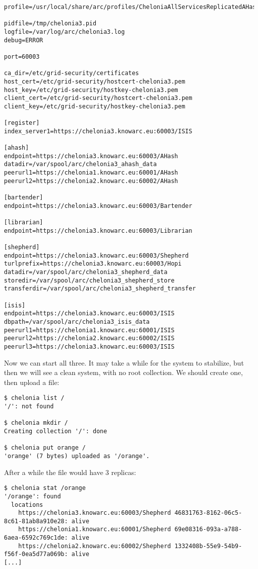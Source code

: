 \documentclass{article}
\begin{document}
\begin{verbatim}
profile=/usr/local/share/arc/profiles/CheloniaAllServicesReplicatedAHashWithISIS.xml

pidfile=/tmp/chelonia3.pid
logfile=/var/log/arc/chelonia3.log
debug=ERROR

port=60003

ca_dir=/etc/grid-security/certificates
host_cert=/etc/grid-security/hostcert-chelonia3.pem
host_key=/etc/grid-security/hostkey-chelonia3.pem
client_cert=/etc/grid-security/hostcert-chelonia3.pem
client_key=/etc/grid-security/hostkey-chelonia3.pem

[register]
index_server1=https://chelonia3.knowarc.eu:60003/ISIS

[ahash]
endpoint=https://chelonia3.knowarc.eu:60003/AHash
datadir=/var/spool/arc/chelonia3_ahash_data
peerurl1=https://chelonia1.knowarc.eu:60001/AHash
peerurl2=https://chelonia2.knowarc.eu:60002/AHash

[bartender]
endpoint=https://chelonia3.knowarc.eu:60003/Bartender

[librarian]
endpoint=https://chelonia3.knowarc.eu:60003/Librarian

[shepherd]
endpoint=https://chelonia3.knowarc.eu:60003/Shepherd
turlprefix=https://chelonia3.knowarc.eu:60003/Hopi
datadir=/var/spool/arc/chelonia3_shepherd_data
storedir=/var/spool/arc/chelonia3_shepherd_store
transferdir=/var/spool/arc/chelonia3_shepherd_transfer

[isis]
endpoint=https://chelonia3.knowarc.eu:60003/ISIS
dbpath=/var/spool/arc/chelonia3_isis_data
peerurl1=https://chelonia1.knowarc.eu:60001/ISIS
peerurl2=https://chelonia2.knowarc.eu:60002/ISIS
peerurl3=https://chelonia3.knowarc.eu:60003/ISIS
\end{verbatim}

Now we can start all three. It may take a while for the system to stabilize, but then we will see a clean system, with no root collection. We should create one, then upload a file:

\begin{verbatim}
$ chelonia list /
'/': not found

$ chelonia mkdir /
Creating collection '/': done

$ chelonia put orange /
'orange' (7 bytes) uploaded as '/orange'.
\end{verbatim}

After a while the file would have 3 replicas:

\begin{verbatim}
$ chelonia stat /orange
'/orange': found
  locations
    https://chelonia3.knowarc.eu:60003/Shepherd 46831763-8162-06c5-8c61-81ab8a910e28: alive
    https://chelonia1.knowarc.eu:60001/Shepherd 69e08316-093a-a788-6aea-6592c769c1de: alive
    https://chelonia2.knowarc.eu:60002/Shepherd 1332408b-55e9-54b9-f56f-0ea5d77a069b: alive
[...]
\end{verbatim}
\end{document}

